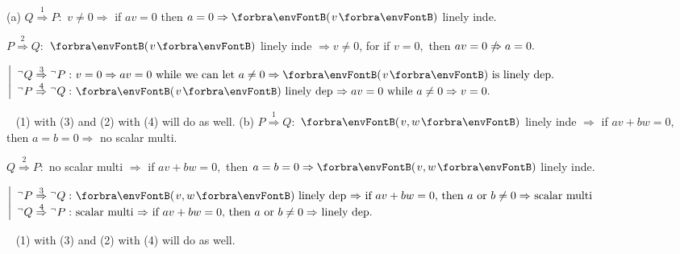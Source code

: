 \par\quad
(a) $Q\overset{1}{\Rightarrow} P:$ $v\neq 0\Rightarrow$ if $av=0$ then $a=0\Rightarrow\Par{v}$ linely inde.\par\quad\Ha
$P\overset{2}{\Rightarrow} Q:$ $\Par{v}$ linely inde $\Rightarrow v\neq 0$, for if $v=0,$ then $av=0\notRightarrow a=0.$\par\vspace{2pt}\quad\Ha
\Or $\MathLeftMid{l}{{}^\neg Q\overset{3}{\Rightarrow}{}^\neg P:$ $v=0\Rightarrow av=0$ while we can let $a\neq 0\Rightarrow\Par{v}$ is linely dep.$\\ {}^\neg P\overset{4}{\Rightarrow}{}^\neg Q:$ $\Par{v}$ linely dep $\Rightarrow av=0$ while $a\neq 0\Rightarrow v=0.$
$}$\par\vspace{4pt}\quad\Ha
\Comment\,\,\, (1) with (3) and (2) with (4) will do as well.\PfEnd\vspace{6pt}\quad
(b) $P\overset{1}{\Rightarrow}Q:$ $\Par{v,w}$ linely inde $\Rightarrow$  if $av+bw=0,$ then $a=b=0\Rightarrow$ no scalar multi.\par\quad\Hb
$Q\overset{2}{\Rightarrow} P:$ no scalar multi $\Rightarrow$ if $av+bw=0,$ then $a=b=0\Rightarrow\Par{v,w}$ linely inde.\par\vspace{2pt}\quad\Hb
\Or $\MathLeftMid{l}{{}^\neg P\overset{3}{\Rightarrow}{}^\neg Q:$ $\Par{v,w}$ linely dep $\Rightarrow$ if $av+bw=0,$ then $a$ or $b\neq 0\Rightarrow$ scalar multi $\\{}^\neg Q\overset{4}{\Rightarrow}{}^\neg P:$ scalar multi $\Rightarrow$ if $av+bw=0,$ then $a$ or $b\neq 0\Rightarrow$ linely dep. $}$
\par\vspace{4pt}\quad\Hb
\Comment\,\,\, (1) with (3) and (2) with (4) will do as well.\PfEnd
\SepLine\pagebreak

